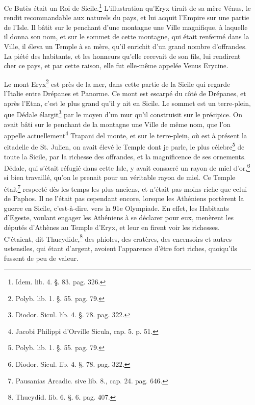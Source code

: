 \documentclass[a4paper, 11pt, oneside, polutonikogreek, french]{article}
\begin{document}
Ce Butès était un Roi de Sicile.\footnote{Idem. lib. 4. §. 83. pag. 326.} L'illustration qu'Eryx tirait de sa mère Vénus, le rendit recommandable aux naturels du pays, et lui acquit l'Empire sur une partie de l'Isle. Il bâtit sur le penchant d'une montagne une Ville magnifique, à laquelle il donna son nom, et sur le sommet de cette montagne, qui était renfermé dans la Ville, il éleva un Temple à sa mère, qu'il enrichit d'un grand nombre d'offrandes. La piété des habitants, et les honneurs qu'elle recevait de son fils, lui rendirent cher ce pays, et par cette raison, elle fut elle-même appelée Venus Erycine.

Le mont Eryx\footnote{Polyb. lib. 1. §. 55. pag. 79.} est près de la mer, dans cette partie de la Sicile qui regarde l'Italie entre Drépanes et Panorme. Ce mont est escarpé du côté de Drépanes, et après l'Etna, c'est le plus grand qu'il y ait en Sicile. Le sommet est un terre-plein, que Dédale élargit\footnote{Diodor. Sicul. lib. 4. §. 78. pag. 322.} par le moyen d'un mur qu'il construisit sur le précipice. On avait bâti sur le penchant de la montagne une Ville de même nom, que l'on appelle actuellement\footnote{Jacobi Philippi d'Orville Sicula, cap. 5. p. 51.} Trapani del monte, et sur le terre-plein, où est à présent la citadelle de St. Julien, on avait élevé le Temple dont je parle, le plus célebre\footnote{Polyb. lib. 1. §. 55. pag. 79.} de toute la Sicile, par la richesse des offrandes, et la magnificence de ses ornements. Dédale, qui s'était réfugié dans cette Isle, y avait consacré un rayon de miel d'or,\footnote{Diodor. Sicul. lib. 4. §. 78. pag. 322.} si bien travaillé, qu'on le prenait pour un véritable rayon de miel. Ce Temple était\footnote{Pausanias Arcadic. sive lib. 8., cap. 24. pag. 646.} respecté dès les temps les plus anciens, et n'était pas moins riche que celui de Paphos. Il ne l'était pas cependant encore, lorsque les Athéniens portèrent la guerre en Sicile, c'est-à-dire, vers la 91e Olympiade. En effet, les Habitants d'Egeste, voulant engager les Athéniens à se déclarer pour eux, menèrent les députés d'Athènes au Temple d'Eryx, et leur en firent voir les richesses. C'étaient, dit Thucydide,\footnote{Thucydid. lib. 6. §. 6. pag. 407.} des phioles, des cratères, des encensoirs et autres ustensiles, qui étant d'argent, avoient l'apparence d'être fort riches, quoiqu'ils fussent de peu de valeur.
\end{document}
